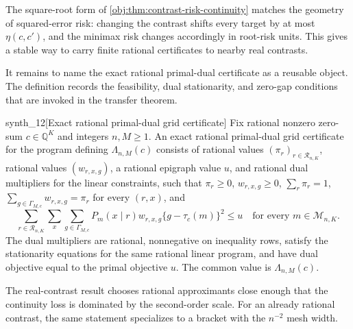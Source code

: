\documentclass[11pt]{article}
\begin{document}
The square-root form of \cref{obj:thm:contrast-risk-continuity} matches the geometry of squared-error risk: changing the contrast shifts every target by at most \(\eta(c,c')\), and the minimax risk changes accordingly in root-risk units. This gives a stable way to carry finite rational certificates to nearby real contrasts.

It remains to name the exact rational primal-dual certificate as a reusable object. The definition records the feasibility, dual stationarity, and zero-gap conditions that are invoked in the transfer theorem.

\begin{definitionv}{synth_12}[Exact rational primal-dual grid certificate]
Fix rational nonzero zero-sum $c\in\mathbb Q^K$ and integers $n,M\ge1$. An exact rational primal-dual grid certificate for the program defining $\Lambda_{n,M}(c)$ consists of rational values $(\pi_r)_{r\in\mathcal R_{n,K}}$, rational values $(w_{r,x,g})$, a rational epigraph value $u$, and rational dual multipliers for the linear constraints, such that $\pi_r\ge0$, $w_{r,x,g}\ge0$, $\sum_r\pi_r=1$, $\sum_{g\in\Gamma_{M,c}}w_{r,x,g}=\pi_r$ for every $(r,x)$, and
\[
\sum_{r\in\mathcal R_{n,K}}\sum_x\sum_{g\in\Gamma_{M,c}}P_m(x\mid r)w_{r,x,g}\{g-\tau_c(m)\}^2\le u
\quad\text{for every }m\in\mathcal M_{n,K}.
\]
The dual multipliers are rational, nonnegative on inequality rows, satisfy the stationarity equations for the same rational linear program, and have dual objective equal to the primal objective $u$. The common value is $\Lambda_{n,M}(c)$.
\end{definitionv}

The real-contrast result chooses rational approximants close enough that the continuity loss is dominated by the second-order scale. For an already rational contrast, the same statement specializes to a bracket with the \(n^{-2}\) mesh width.
\end{document}
